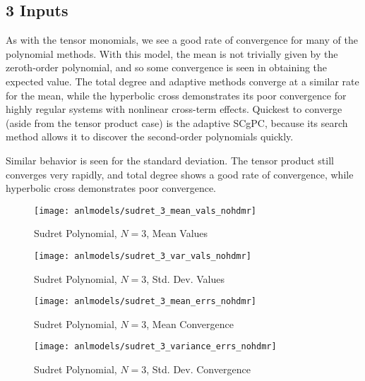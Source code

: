 \subsection{3 Inputs}
As with the tensor monomials, we see a good rate of convergence for many of the polynomial methods.  With
this model, the mean is not trivially given by the zeroth-order polynomial, and so some convergence is seen
in obtaining the expected value.  The total degree and adaptive methods converge at a similar rate for
the mean, while the hyperbolic cross demonstrates its poor convergence for highly regular systems with
nonlinear cross-term effects.  Quickest to converge (aside from the tensor product case) is the adaptive
SCgPC, because its search method allows it to discover the second-order polynomials quickly.

Similar behavior is seen for the standard deviation.
The tensor product still converges very rapidly, and total degree shows a good rate of convergence, while
hyperbolic cross demonstrates poor convergence.
\begin{figure}[H]
  \centering
  \texttt{[image: anlmodels/sudret\_3\_mean\_vals\_nohdmr]}
  \caption{Sudret Polynomial, $N=3$, Mean Values}
  \label{fig:sudretpoly mean values 3}
\end{figure}
\begin{figure}[H]
  \centering
  \texttt{[image: anlmodels/sudret\_3\_var\_vals\_nohdmr]}
  \caption{Sudret Polynomial, $N=3$, Std. Dev. Values}
  \label{fig:sudretpoly var values 3}
\end{figure}

\begin{figure}[H]
  \centering
  \texttt{[image: anlmodels/sudret\_3\_mean\_errs\_nohdmr]}
  \caption{Sudret Polynomial, $N=3$, Mean Convergence}
  \label{fig:sudretpoly mean errors 3}
\end{figure}
\begin{figure}[H]
  \centering
  \texttt{[image: anlmodels/sudret\_3\_variance\_errs\_nohdmr]}
  \caption{Sudret Polynomial, $N=3$, Std. Dev. Convergence}
  \label{fig:sudretpoly var errors 3}
\end{figure}

